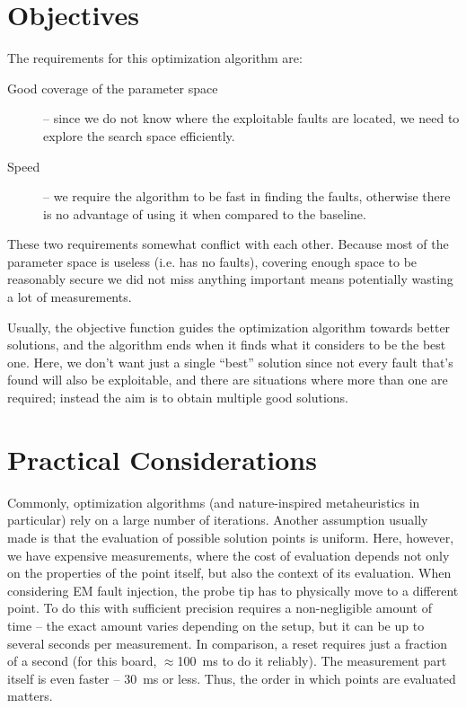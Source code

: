 \documentclass[times, utf8, diplomski]{fer}
\begin{document}
\section{Objectives}\label{sec:objectives}
The requirements for this optimization algorithm are:
\begin{description}
    \item[Good coverage of the parameter space] -- since we do not know where the
          exploitable faults are located, we need to explore the search space efficiently.
    \item[Speed] -- we require the algorithm to be fast in finding the faults, otherwise
          there is no advantage of using it when compared to the baseline.
\end{description}

These two requirements somewhat conflict with each other. Because most of the
parameter space is useless (i.e. has no faults), covering enough space to be
reasonably secure we did not miss anything important means potentially wasting
a lot of measurements.

Usually, the objective function guides the optimization algorithm towards better
solutions, and the algorithm ends when it finds what it considers to be the best
one. Here, we don't want just a single ``best'' solution since not every fault
that's found will also be exploitable, and there are situations where more than
one are required; instead the aim is to obtain multiple good solutions.



\section{Practical Considerations}\label{sec:practical_considerations}
Commonly, optimization algorithms (and nature-inspired metaheuristics in
particular) rely on a large number of iterations. Another assumption usually
made is that the evaluation of possible solution points is uniform. Here,
however, we have expensive measurements, where the cost of evaluation depends
not only on the properties of the point itself, but also the context of its
evaluation.
%
When considering EM fault injection, the probe tip has to physically move to
a different point. To do this with sufficient precision requires a non-negligible
amount of time -- the exact amount varies depending on the setup, but it can be
up to several seconds per measurement. In comparison, a reset requires just a
fraction of a second (for this board, $\approx$\SI{100}{\milli\second} to do it
reliably). The measurement part itself is even faster -- \SI{30}{\milli\second}
or less. Thus, the order in which points are evaluated matters.
\end{document}
